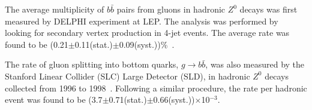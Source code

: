 







The average multiplicity of $b\bar{b}$ pairs from gluons in hadronic $Z^0$ decays was first measured by DELPHI experiment at LEP. The analysis was performed by looking for secondary vertex production in 4-jet events. The average rate was found to be (0.21$\pm$0.11(stat.)$\pm$0.09(syst.))\%~\cite{Abreu:1997nf}.

The rate of gluon splitting into bottom quarks, $g \rightarrow b\bar{b}$, was also measured by the Stanford Linear Collider (SLC) Large Detector (SLD), in hadronic $Z^0$ decays collected from 1996 to 1998~\cite{Abe:1999vw}. Following a similar procedure, the rate per hadronic event was found to be (3.7$\pm$0.71(stat.)$\pm$0.66(syst.))$\times$10$^{-3}$. %

